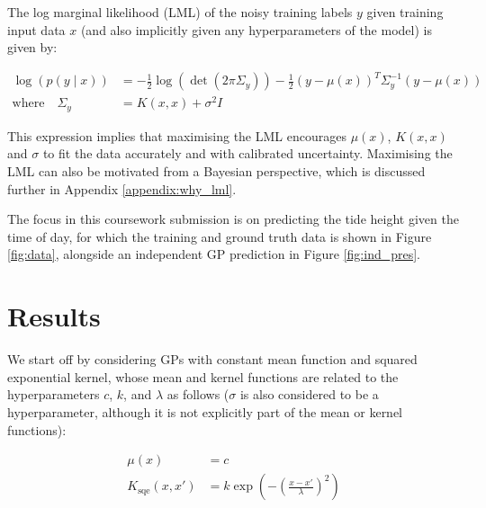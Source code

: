 \documentclass{article}
\begin{document}
The log marginal likelihood (LML) of the noisy training labels $y$ given training input data $x$ (and also implicitly given any hyperparameters of the model) is given by:


\begin{align}
    \log \left( p(y \mid x) \right) &= -\frac{1}{2}\log\left(\det \left(2\pi \Sigma_y \right)\right) -\frac{1}{2}(y - \mu(x))^T \Sigma_y^{-1} (y - \mu(x)) \\
    \text{where} \quad \Sigma_y &= K(x, x) + \sigma^2 I
\end{align}

This expression implies that maximising the LML encourages $\mu(x)$, $K(x,x)$ and $\sigma$ to fit the data accurately and with calibrated uncertainty. Maximising the LML can also be motivated from a Bayesian perspective, which is discussed further in Appendix \ref{appendix:why_lml}.

The focus in this coursework submission is on predicting the tide height given the time of day, for which the training and ground truth data is shown in Figure \ref{fig:data}, alongside an independent GP prediction in Figure \ref{fig:ind_pres}.


\section{Results}

We start off by considering GPs with constant mean function and squared exponential kernel, whose mean and kernel functions are related to the hyperparameters $c$, $k$, and $\lambda$ as follows ($\sigma$ is also considered to be a hyperparameter, although it is not explicitly part of the mean or kernel functions):


\begin{align}
\mu(x) &= c \\
K_{\mathrm{sqe}}(x, x') &= k \exp\left( -\left( \frac{x - x'}{\lambda} \right)^2 \right)
\end{align}
\end{document}

